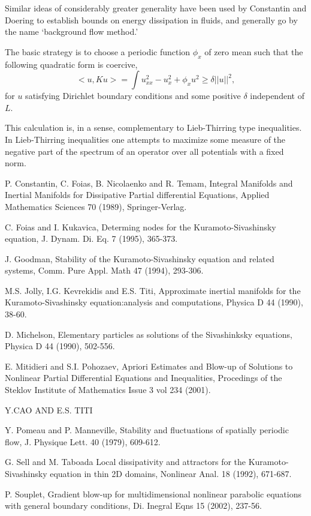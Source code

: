 Similar ideas of 
considerably greater generality have been used by Constantin and Doering
to establish bounds on energy dissipation in fluids, and generally 
go by the name `background flow method.'\cite{CD1,CD2} 

The basic strategy is to choose a 
periodic function $\phi_x$ of zero mean such that the following 
quadratic form is coercive,
\[
<\!\!u, K u\!\!>= \int u_{xx}^2 - u_x^2 + \phi_x u^2 \ge \delta |\!|u|\!|^2, 
\]
for $u$ satisfying Dirichlet boundary conditions and some positive 
$\delta$ independent of $L$.  

This calculation is, in a sense, complementary to Lieb-Thirring type 
inequalities.
In Lieb-Thirring inequalities one attempts to maximize some measure of the 
negative part of the spectrum of an operator over all potentials with 
a fixed norm. 



P. Constantin, C. Foias, B. Nicolaenko and R. Temam, Integral Manifolds and Inertial Manifolds for Dissipative Partial differential Equations, Applied Mathematics Sciences 70 (1989), Springer-Verlag.

C. Foias and I. Kukavica, Determing nodes for the Kuramoto-Sivashinsky equation, J. Dynam. Di. Eq. 7 (1995), 365-373.

J. Goodman, Stability of the Kuramoto-Sivashinsky equation and related systems, Comm. Pure Appl. Math 47 (1994), 293-306.

M.S. Jolly, I.G. Kevrekidis and E.S. Titi, Approximate inertial manifolds for the Kuramoto-Sivashinsky equation:analysis and computations, Physica D 44 (1990), 38-60.

D. Michelson, Elementary particles as solutions of the Sivashinksky equations, Physica D 44 (1990), 502-556.

E. Mitidieri and S.I. Pohozaev, Apriori Estimates and Blow-up of Solutions to Nonlinear Partial Differential Equations and Inequalities, Procedings of the Steklov Institute of Mathematics Issue 3 vol 234 (2001).

Y.CAO AND E.S. TITI 

Y. Pomeau and P. Manneville, Stability and fluctuations of spatially periodic flow, J. Physique Lett. 40 (1979), 609-612.

G. Sell and M. Taboada Local dissipativity and attractors for the Kuramoto-Sivashinsky equation in thin 2D domains, Nonlinear Anal. 18 (1992), 671-687.

P. Souplet, Gradient blow-up for multidimensional nonlinear parabolic equations with general boundary conditions, Di. Inegral Eqns 15 (2002), 237-56.

